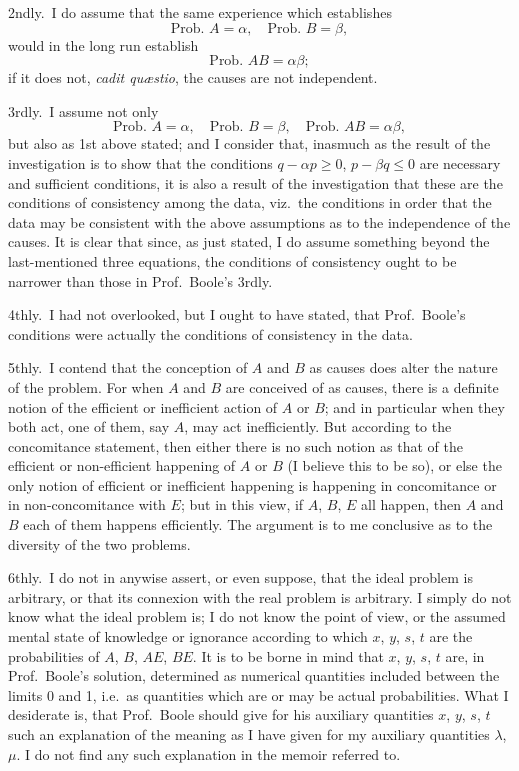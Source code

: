 \documentclass[11pt,a4paper]{article}
\theoremstyle{plain}
\begin{document}
2ndly.\ I do assume that the same experience which establishes
\[
\text{Prob.\ } A = \alpha, \quad \text{Prob.\ } B = \beta,
\]
would in the long run establish
\[
\text{Prob.\ } AB = \alpha\beta;
\]
if it does not, \textit{cadit qu\ae stio}, the causes are not independent.

3rdly.\ I assume not only
\[
\text{Prob.\ } A = \alpha, \quad \text{Prob.\ } B = \beta, \quad \text{Prob.\ } AB = \alpha\beta,
\]
but also as 1st above stated; and I consider that, inasmuch as the result of the investigation is to show that the conditions $q - \alpha p \geq 0$, $p - \beta q \leq 0$ are necessary and sufficient conditions, it is also a result of the investigation that these are the conditions of consistency among the data, viz.\ the conditions in order that the data may be consistent with the above assumptions as to the independence of the causes. It is clear that since, as just stated, I do assume something beyond the last-mentioned three equations, the conditions of consistency ought to be narrower than those in Prof.\ Boole's 3rdly.

4thly.\ I had not overlooked, but I ought to have stated, that Prof.\ Boole's conditions were actually the conditions of consistency in the data.

5thly.\ I contend that the conception of $A$ and $B$ as causes does alter the nature of the problem. For when $A$ and $B$ are conceived of as causes, there is a definite notion of the efficient or inefficient action of $A$ or $B$; and in particular when they both act, one of them, say $A$, may act inefficiently. But according to the concomitance statement, then either there is no such notion as that of the efficient or non-efficient happening of $A$ or $B$ (I believe this to be so), or else the only notion of efficient or inefficient happening is happening in concomitance or in non-concomitance with $E$; but in this view, if $A$, $B$, $E$ all happen, then $A$ and $B$ each of them happens efficiently. The argument is to me conclusive as to the diversity of the two problems.

6thly.\ I do not in anywise assert, or even suppose, that the ideal problem is arbitrary, or that its connexion with the real problem is arbitrary. I simply do not know what the ideal problem is; I do not know the point of view, or the assumed mental state of knowledge or ignorance according to which $x$, $y$, $s$, $t$ are the probabilities of $A$, $B$, $AE$, $BE$. It is to be borne in mind that $x$, $y$, $s$, $t$ are, in Prof.\ Boole's solution, determined as numerical quantities included between the limits 0 and 1, i.e.\ as quantities which are or may be actual probabilities. What I desiderate is, that Prof.\ Boole should give for his auxiliary quantities $x$, $y$, $s$, $t$ such an explanation of the meaning as I have given for my auxiliary quantities $\lambda$, $\mu$. I do not find any such explanation in the memoir referred to.
\end{document}
